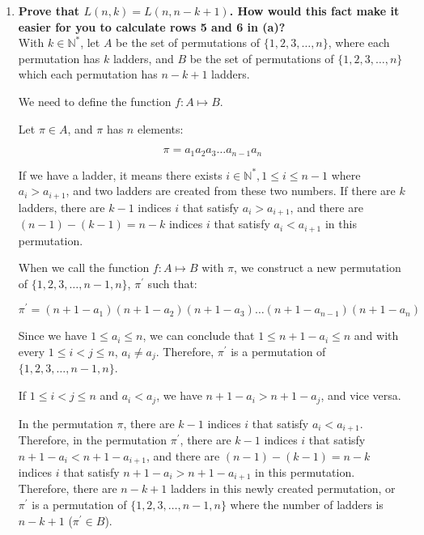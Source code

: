 \documentclass[10pt]{article}
\begin{document}
\begin{enumerate}
\begin{enumerate}
$$1$$
$$1 \quad 1$$
$$1\quad 4\quad 1$$
$$1\quad 11\quad 11\quad 1$$

		{\footnotesize \it \textbf{Note:} Since there are $n!$ permutations, make sure each row sums to $n!$.}


	\item
	\textbf{Prove that $L(n,k) = L(n, n-k+1)$. How would this fact make it easier for you to calculate rows 5 and 6 in (a)?}\\  

    With $k \in \mathbb{N}^*$, let $A$ be the set of permutations of $\{1,2,3,\ldots,n\}$, where each permutation has $k$ ladders, and $B$ be the set of permutations of  $\{1,2,3,\ldots,n\}$ which each permutation has $n-k+1$ ladders.
    
    We need to define the function $f: A \mapsto B$.
    
	Let $\pi \in A$, and $\pi$ has $n$ elements:

    $$\pi = a_1a_2a_3\ldots a_{n-1}a_n$$

    If we have a ladder, it means there exists $i \in \mathbb{N}^*, 1 \leq i \leq n - 1$ where $a_i > a_{i+1}$, and two ladders are created from these two numbers. If there are $k$ ladders, there are $k-1$ indices $i$ that satisfy $a_i > a_{i+1}$, and there are $(n-1) - (k-1) = n - k$ indices $i$ that satisfy $a_i < a_{i+1}$ in this permutation.

    When we call the function $f: A \mapsto B$ with $\pi$, we construct a new permutation of $\{1,2,3,\ldots,n-1,n\}$, $\pi^{'}$ such that:

    $$\pi^{'} = (n+1-a_1)(n+1-a_2)(n+1-a_3)\ldots (n+1-a_{n-1})(n+1-a_n)$$

    Since we have $1 \leq a_i \leq n$, we can conclude that $1 \leq n+1 - a_i \leq n$ and with every $1 \leq i < j\leq n$, $a_i \neq a_j$. Therefore, $\pi^{'}$ is a permutation of $\{1,2,3,\ldots,n-1,n\}$.
    
    If $1 \leq i < j \leq n$ and $a_i < a_j$, we have $n+1-a_i > n+1-a_j$, and vice versa. 

    In the permutation $\pi$, there are $k-1$ indices $i$ that satisfy $a_i < a_{i+1}$. Therefore, in the permutation $\pi^{'}$, there are $k-1$ indices $i$ that satisfy $n + 1 - a_i < n + 1 - a_{i+1}$, and there are $(n-1) - (k-1) = n - k$ indices $i$ that satisfy $n + 1 - a_i > n + 1 - a_{i+1}$ in this permutation. Therefore, there are $n-k+1$ ladders in this newly created permutation, or $\pi^{'}$ is a permutation of $\{1,2,3,\ldots,n-1,n\}$ where the number of ladders is $n-k+1$ ($\pi^{'} \in B$).


\end{enumerate}
\end{enumerate}
\end{document}
